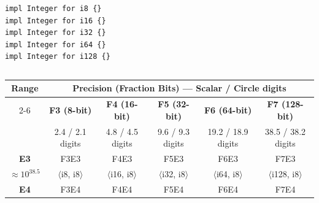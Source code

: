 \documentclass[12pt,letter]{article}
\begin{document}
\begin{lstlisting}[style=rust, caption={Where fraction: F and exponent: E are any sized integer}, label={fig:integer}]
impl Integer for i8 {}
impl Integer for i16 {}
impl Integer for i32 {}
impl Integer for i64 {}
impl Integer for i128 {}
\end{lstlisting}
\newpage
\begin{lstlisting}[caption={FE Type Configurations - Precision vs. Range}, label={fig:spirix_configurations}]
\end{lstlisting}
\begin{table}[h!]
    \centering
    \renewcommand{\arraystretch}{1.4}
    \begin{tabular}{|c|c|c|c|c|c|}
        \hline
        \multirow{2}{*}{\textbf{Range}}  & \multicolumn{5}{c|}{\textbf{Precision (Fraction Bits) --- Scalar / Circle digits}}                                                                                                                                                          \\
        \cline{2-6}
                                         & \textbf{F3 (8-bit)}                                                                & \textbf{F4 (16-bit)}                & \textbf{F5 (32-bit)}                & \textbf{F6 (64-bit)}                & \textbf{F7 (128-bit)}                \\
                                         & \small{2.4 / 2.1 digits}                                                           & \small{4.8 / 4.5 digits}            & \small{9.6 / 9.3 digits}            & \small{19.2 / 18.9 digits}          & \small{38.5 / 38.2 digits}           \\
        \hline
        \textbf{E3}                      & F3E3                                                                               & F4E3                                & F5E3                                & F6E3                                & F7E3                                 \\
        \small{$\approx 10^{38.5}$}      & \small{$\langle$i8, i8$\rangle$}                                                   & \small{$\langle$i16, i8$\rangle$}   & \small{$\langle$i32, i8$\rangle$}   & \small{$\langle$i64, i8$\rangle$}   & \small{$\langle$i128, i8$\rangle$}   \\
        \hline
        \textbf{E4}                      & F3E4                                                                               & F4E4                                & F5E4                                & F6E4                                & F7E4                                 \\

\end{tabular}
\end{table}
\end{document}
